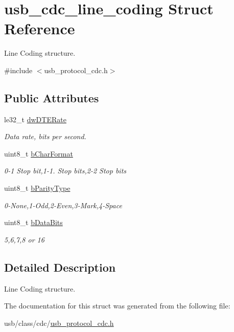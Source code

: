 \hypertarget{structusb__cdc__line__coding}{}\section{usb\+\_\+cdc\+\_\+line\+\_\+coding Struct Reference}
\label{structusb__cdc__line__coding}


Line Coding structure.  




{\ttfamily \#include $<$usb\+\_\+protocol\+\_\+cdc.\+h$>$}

\subsection*{Public Attributes}
\begin{DoxyCompactItemize}
\item 
\mbox{\label{structusb__cdc__line__coding_a9a9f480677e820cbb22676f4c525b98e}} 
le32\+\_\+t \hyperlink{structusb__cdc__line__coding_a9a9f480677e820cbb22676f4c525b98e}{dw\+D\+T\+E\+Rate}
\begin{DoxyCompactList}\small\item\em Data rate, bits per second. \end{DoxyCompactList}\item 
\mbox{\label{structusb__cdc__line__coding_aae309443995f9fe84f44a78bd866cc1a}} 
uint8\+\_\+t \hyperlink{structusb__cdc__line__coding_aae309443995f9fe84f44a78bd866cc1a}{b\+Char\+Format}
\begin{DoxyCompactList}\small\item\em 0-\/1 Stop bit,1-\/1. Stop bits,2-\/2 Stop bits \end{DoxyCompactList}\item 
\mbox{\label{structusb__cdc__line__coding_ad1b91d6baa7411fa9f6341140f5ac216}} 
uint8\+\_\+t \hyperlink{structusb__cdc__line__coding_ad1b91d6baa7411fa9f6341140f5ac216}{b\+Parity\+Type}
\begin{DoxyCompactList}\small\item\em 0-\/\+None,1-\/\+Odd,2-\/\+Even,3-\/\+Mark,4-\/\+Space \end{DoxyCompactList}\item 
\mbox{\label{structusb__cdc__line__coding_a81e0e896a0524b8db945e1a8b50668e6}} 
uint8\+\_\+t \hyperlink{structusb__cdc__line__coding_a81e0e896a0524b8db945e1a8b50668e6}{b\+Data\+Bits}
\begin{DoxyCompactList}\small\item\em 5,6,7,8 or 16 \end{DoxyCompactList}\end{DoxyCompactItemize}


\subsection{Detailed Description}
Line Coding structure. 

The documentation for this struct was generated from the following file\+:\begin{DoxyCompactItemize}
\item 
usb/class/cdc/\hyperlink{usb__protocol__cdc_8h}{usb\+\_\+protocol\+\_\+cdc.\+h}\end{DoxyCompactItemize}
